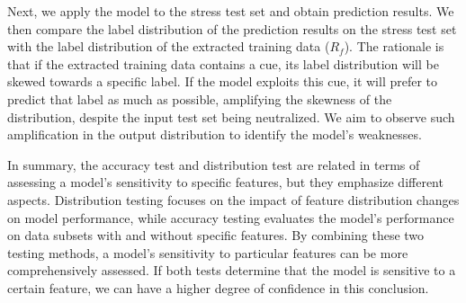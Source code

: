 Next, we apply the model to the stress test set 
and obtain prediction results. We then compare 
the label distribution of the prediction results 
on the stress test set with the label distribution 
of the extracted training data ($R_f$). The rationale is 
that if the extracted training data contains a cue, 
its label distribution will be skewed towards a specific label. 
If the model exploits this cue, it will prefer to predict that 
label as much as possible, amplifying the skewness of the distribution, 
despite the input test set being neutralized. 
We aim to observe such amplification in the 
output distribution to identify the model's weaknesses.

In summary, the accuracy test and distribution test are 
related in terms of assessing a model's sensitivity to 
specific features, but they emphasize different aspects. 
Distribution testing focuses on the impact of feature 
distribution changes on model performance, while accuracy 
testing evaluates the model's performance on data subsets 
with and without specific features. By combining these 
two testing methods, a model's sensitivity to particular 
features can be more comprehensively assessed. 
If both tests determine that the model is sensitive to 
a certain feature, we can have a higher degree of confidence in this conclusion.
